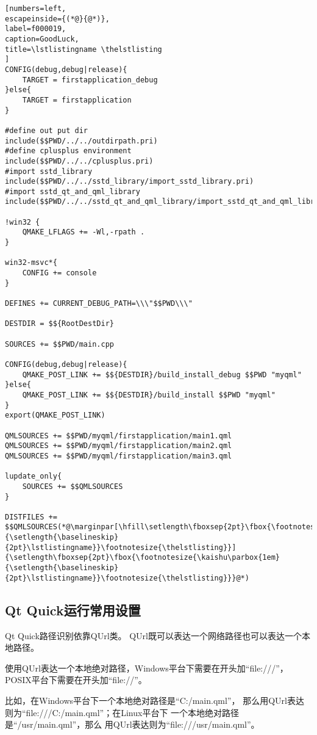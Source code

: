 {\begin{lstlisting}[numbers=left,
escapeinside={(*@}{@*)},
label=f000019,
caption=GoodLuck,
title=\lstlistingname \thelstlisting
]
CONFIG(debug,debug|release){
    TARGET = firstapplication_debug
}else{
    TARGET = firstapplication
}

#define out put dir
include($$PWD/../../outdirpath.pri)
#define cplusplus environment
include($$PWD/../../cplusplus.pri)
#import sstd_library
include($$PWD/../../sstd_library/import_sstd_library.pri)
#import sstd_qt_and_qml_library
include($$PWD/../../sstd_qt_and_qml_library/import_sstd_qt_and_qml_library.pri)

!win32 {
    QMAKE_LFLAGS += -Wl,-rpath .
}

win32-msvc*{
    CONFIG += console
}

DEFINES += CURRENT_DEBUG_PATH=\\\"$$PWD\\\"

DESTDIR = $${RootDestDir}

SOURCES += $$PWD/main.cpp

CONFIG(debug,debug|release){
    QMAKE_POST_LINK += $${DESTDIR}/build_install_debug $$PWD "myqml"
}else{
    QMAKE_POST_LINK += $${DESTDIR}/build_install $$PWD "myqml"
}
export(QMAKE_POST_LINK)

QMLSOURCES += $$PWD/myqml/firstapplication/main1.qml
QMLSOURCES += $$PWD/myqml/firstapplication/main2.qml
QMLSOURCES += $$PWD/myqml/firstapplication/main3.qml

lupdate_only{
    SOURCES += $$QMLSOURCES
}

DISTFILES += $$QMLSOURCES(*@\marginpar[\hfill\setlength\fboxsep{2pt}\fbox{\footnotesize{\kaishu\parbox{1em}{\setlength{\baselineskip}{2pt}\lstlistingname}}\footnotesize{\thelstlisting}}]{\setlength\fboxsep{2pt}\fbox{\footnotesize{\kaishu\parbox{1em}{\setlength{\baselineskip}{2pt}\lstlistingname}}\footnotesize{\thelstlisting}}}@*)\end{lstlisting}          %
}\fi

\FloatBarrier
\subsection{
Qt Quick运行常用设置
}\label{ss001v10}


Qt Quick路径识别依靠QUrl类。
QUrl既可以表达一个网络路径也可以表达一个本地路径。

使用QUrl表达一个本地绝对路径，Windows平台下需要在开头加“file:///”，
POSIX平台下需要在开头加“file://”。

比如，在Windows平台下一个本地绝对路径是“C:/main.qml”，
那么用QUrl表达则为“file:///C:/main.qml”；在Linux平台下
一个本地绝对路径是“/usr/main.qml”，那么
用QUrl表达则为“file:///usr/main.qml”。

